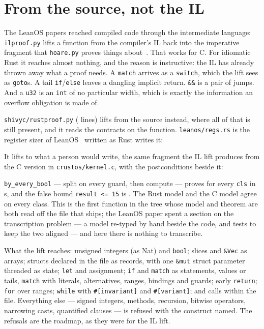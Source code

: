 \documentclass[11pt]{article}
\begin{document}
\section{From the source, not the IL}\label{sec:lift}

The LeanOS papers reached compiled code through the intermediate language:
\texttt{ilproof.py} lifts a function from the compiler's IL back into the
imperative fragment that \texttt{hoare.py} proves things
about~\cite{hartshorn2026leanos}.  That works for C.  For idiomatic Rust it
reaches almost nothing, and the reason is instructive: the IL has already
thrown away what a proof needs.  A \texttt{match} arrives as a
\texttt{switch}, which the lift sees as \texttt{goto}s.  A tail
\texttt{if}/\texttt{else} leaves a dangling implicit return.  \texttt{\&\&}
is a pair of jumps.  And a \texttt{u32} is an \texttt{int} of no particular
width, which is exactly the information an overflow obligation is made of.

\texttt{shivyc/rustproof.py} (\liftLines{} lines) lifts from the source
instead, where all of that is still present, and it reads the contracts on
the function.  \texttt{leanos/regs.rs} is the register sizer of
LeanOS~\cite{hartshorn2026leanos} written as Rust writes it:



It lifts to what a person would write, the same fragment the IL lift
produces from the C version in \texttt{crustos/kernel.c}, with the
postconditions beside it:



\texttt{by\_every\_bool} --- split on every guard, then compute --- proves
\texttt{\regsEnsures} for every \texttt{cls} in \regsSeconds{}\,s, and the
false bound \texttt{result <= 15} is \regsFalseBound.  The Rust model and the
C model agree on every class.  This is the first function in the tree whose
model and theorem are both read off the file that ships; the LeanOS paper
spent a section on the transcription problem --- a model re-typed by hand
beside the code, and tests to keep the two aligned --- and here there is
nothing to transcribe.

What the lift reaches: unsigned integers (as Nat) and \texttt{bool};
slices and \texttt{\&Vec} as arrays; structs declared in the file as records,
with one \texttt{\&mut} struct parameter threaded as state; \texttt{let} and
assignment; \texttt{if} and \texttt{match} as statements, values or tails,
\texttt{match} with literals, alternatives, ranges, bindings and guards;
early \texttt{return}; \texttt{for} over ranges; \texttt{while} with
\texttt{\#[invariant]} and \texttt{\#[variant]}; and calls within the file.
Everything else --- signed integers, methods, recursion, bitwise operators,
narrowing casts, quantified clauses --- is refused with the construct named.
The refusals are the roadmap, as they were for the IL lift.
\end{document}
